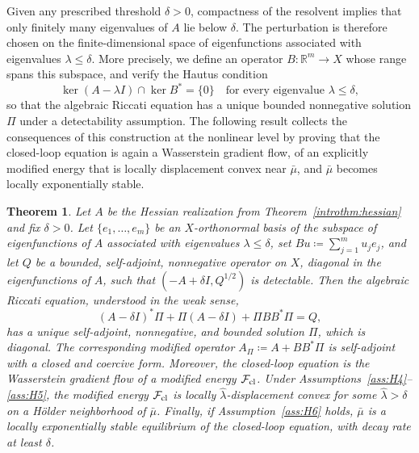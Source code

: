 \documentclass[11pt]{article}
\numberwithin{equation}{section}
\newtheorem{introtheorem}{Theorem}
\theoremstyle{definition}
\newcommand{\R}{\mathbb{R}}
\newcommand{\F}{\mathcal{F}}
\begin{document}
Given any prescribed threshold $\delta > 0$, compactness of the resolvent implies that only finitely many eigenvalues of $A$ lie below $\delta$. 
The perturbation is therefore chosen on the finite-dimensional space of eigenfunctions associated with eigenvalues $\lambda \le \delta$.
More precisely, we define an operator $B : \R^m \to X$ whose range spans this subspace, and verify the Hautus condition
\[
\ker(A - \lambda I) \cap \ker B^* = \{0\} \quad \text{for every eigenvalue } \lambda \le \delta,
\]
so that the algebraic Riccati equation has a unique bounded nonnegative solution $\Pi$ under a detectability assumption.
The following result collects the consequences of this construction at the nonlinear level by proving that the closed-loop equation is again a Wasserstein gradient flow, of an explicitly modified energy that is locally displacement convex near $\bar\mu$, and $\bar\mu$ becomes locally exponentially stable.

\begin{introtheorem}
    \label{introthm:convexification}
    Let $A$ be the Hessian realization from Theorem~\ref{introthm:hessian} and fix $\delta > 0$.
    Let $\{e_1, \dots, e_m\}$ be an $X$-orthonormal basis of the subspace of eigenfunctions of $A$ associated with eigenvalues $\lambda \le \delta$, set $B u \coloneqq \sum_{j=1}^m u_j e_j$, and let $Q$ be a bounded, self-adjoint, nonnegative operator on $X$, diagonal in the eigenfunctions of $A$, such that $(-A + \delta I, Q^{1/2})$ is detectable.
    Then the algebraic Riccati equation, understood in the weak sense,
    \[
    (A - \delta I)^* \Pi + \Pi(A - \delta I) + \Pi BB^* \Pi = Q,
    \]
    has a unique self-adjoint, nonnegative, and bounded solution $\Pi$, which is diagonal. 
    The corresponding modified operator $A_\Pi \coloneqq A + BB^*\Pi$ is self-adjoint with a closed and coercive form.
    Moreover, the closed-loop equation is the Wasserstein gradient flow of a modified energy $\F_{\rm cl}$.
    Under Assumptions~\ref{ass:H4}--\ref{ass:H5}, the modified energy $\F_{\rm cl}$ is locally $\hat{\lambda}$-displacement convex for some $\hat{\lambda} > \delta$ on a H\"older neighborhood of $\bar\mu$.
    Finally, if Assumption~\ref{ass:H6} holds, $\bar\mu$ is a locally exponentially stable equilibrium of the closed-loop equation, with decay rate at least $\delta$.
\end{introtheorem}
\end{document}
